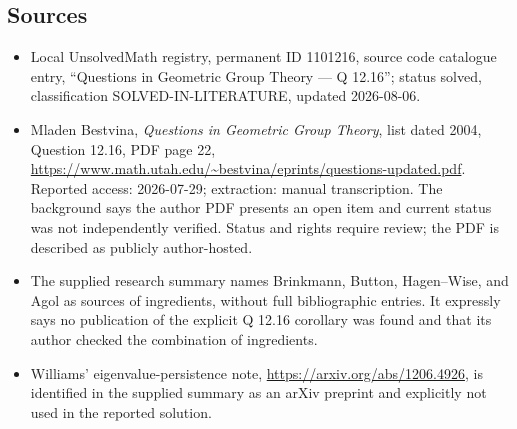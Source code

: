 \documentclass[11pt]{article}
\begin{document}
\subsection{Sources}
\begin{itemize}
\item Local UnsolvedMath registry, permanent ID 1101216, source code catalogue entry, ``Questions in Geometric Group Theory --- Q 12.16''; status solved, classification SOLVED-IN-LITERATURE, updated 2026-08-06.
\item Mladen Bestvina, \emph{Questions in Geometric Group Theory}, list dated 2004, Question 12.16, PDF page 22, \url{https://www.math.utah.edu/~bestvina/eprints/questions-updated.pdf}. Reported access: 2026-07-29; extraction: manual transcription. The background says the author PDF presents an open item and current status was not independently verified. Status and rights require review; the PDF is described as publicly author-hosted.
\item The supplied research summary names Brinkmann, Button, Hagen--Wise, and Agol as sources of ingredients, without full bibliographic entries. It expressly says no publication of the explicit Q 12.16 corollary was found and that its author checked the combination of ingredients.
\item Williams' eigenvalue-persistence note, \url{https://arxiv.org/abs/1206.4926}, is identified in the supplied summary as an arXiv preprint and explicitly not used in the reported solution.
\end{itemize}
\end{document}
